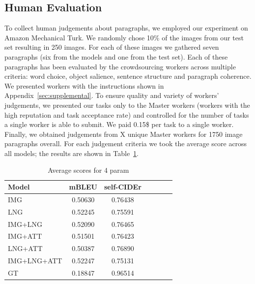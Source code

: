 \documentclass[11pt,a4paper]{article}
\begin{document}

\subsection{Human Evaluation}

To collect human judgements about paragraphs, we employed our experiment on Amazon Mechanical Turk.
We randomly chose 10\% of the images from our test set resulting in 250 images.
For each of these images we gathered seven paragraphs (six from the models and one from the test set).
Each of these paragraphs has been evaluated by the crowdsourcing workers across multiple criteria: word choice, object salience, sentence structure and paragraph coherence.
We presented workers with the instructions shown in Appendix~\ref{sec:supplemental}.
To ensure quality and variety of workers' judgements, we presented our tasks only to the Master workers (workers with the high reputation and task acceptance rate) and controlled for the number of tasks a single worker is able to submit.
We paid 0.15\$ per task to a single worker.
Finally, we obtained judgements from X unique Master workers for 1750 image paragraphs overall.
For each judgement criteria we took the average score across all models; the results are shown in Table~\ref{tab:humeval}.

\begin{table}[h]
   \footnotesize
  \centering
  \begin{tabular}{|l|c|c|c|c|c|c|}
  \hline
    \textbf{Model} & \textbf{mBLEU} & \textbf{self-CIDEr}  \\
  \hline
   IMG & \cellcolor{blue!20}0.50630 & 0.76438 \\
  \hline
   LNG & 0.52245 & 0.75591 \\
  \hline
   IMG+LNG & 0.52090 & \cellcolor{blue!20}0.76465  \\
  \hline
  \hline
   IMG+ATT & \cellcolor{blue!10}0.51501 & \cellcolor{blue!10}0.76423 \\
  \hline
   LNG+ATT & \cellcolor{blue!50}0.50387 & \cellcolor{blue!50}0.76890  \\
  \hline
   IMG+LNG+ATT & 0.52247 & 0.75131 \\
  \hline
  \hline
   GT & 0.18847 & 0.96514 \\
  \hline
  \end{tabular}
  \caption{Average scores for 4 param}
  \label{tab:humeval}
\end{table}
\end{document}
